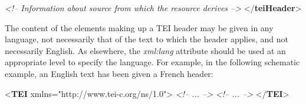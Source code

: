 \begin{shaded}
\hspace*{1em}\mbox{}\newline 
\hspace*{1em}\mbox{}\newline 
\hspace*{1em}\hspace*{1em}\mbox{}\newline 
\textit{<!-- Information about source from which the resource derives -->}\mbox{}\newline 
\hspace*{1em}\hspace*{1em}\mbox{}\newline 
\hspace*{1em}\mbox{}\newline 
{}\mbox{}\newline 
{</\textbf{teiHeader}>}\end{shaded}\egroup\par \par
The content of the elements making up a TEI header may be given in any language, not necessarily that of the text to which the header applies, and not necessarily English. As elsewhere, the {\itshape xml:lang} attribute should be used at an appropriate level to specify the language. For example, in the following schematic example, an English text has been given a French header: \par\bgroup{}\exampleFont \begin{shaded}\noindent\mbox{}{<\textbf{TEI} xmlns="http://www.tei-c.org/ns/1.0">}\mbox{}\newline 
{}\mbox{}\newline 
\textit{<!-- ... -->}\mbox{}\newline 
{}\mbox{}\newline 
{}\mbox{}\newline 
\textit{<!-- ... -->}\mbox{}\newline 
{}\mbox{}\newline 
{</\textbf{TEI}>}\end{shaded}\egroup\par \par
